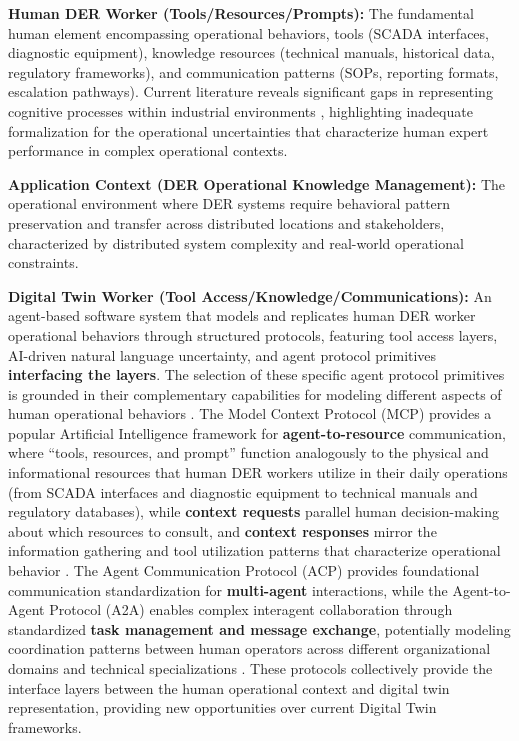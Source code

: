 \documentclass[12pt,a4paper]{article}
\begin{document}
\textbf{Human DER Worker (Tools/Resources/Prompts):} The fundamental human element encompassing operational behaviors, tools (SCADA interfaces, diagnostic equipment), knowledge resources (technical manuals, historical data, regulatory frameworks), and communication patterns (SOPs, reporting formats, escalation pathways). Current literature reveals significant gaps in representing cognitive processes within industrial environments \cite{10.1007/s44163-022-00020-w} \cite{10.1016/j.apergo.2018.07.016}, highlighting inadequate formalization for the operational uncertainties that characterize human expert performance in complex operational contexts.

\textbf{Application Context (DER Operational Knowledge Management):} The operational environment where DER systems require behavioral pattern preservation and transfer across distributed locations and stakeholders, characterized by distributed system complexity and real-world operational constraints.

\textbf{Digital Twin Worker (Tool Access/Knowledge/Communications):} An agent-based software system that models and replicates human DER worker operational behaviors through structured protocols, featuring tool access layers, AI-driven natural language uncertainty, and agent protocol primitives \textbf{interfacing the layers}. The selection of these specific agent protocol primitives is grounded in their complementary capabilities for modeling different aspects of human operational behaviors \cite{2504.16736v2} \cite{2505.02279}. The Model Context Protocol (MCP) provides a popular Artificial Intelligence framework for \textbf{agent-to-resource} communication, where ``tools, resources, and prompt'' function analogously to the physical and informational resources that human DER workers utilize in their daily operations (from SCADA interfaces and diagnostic equipment to technical manuals and regulatory databases), while \textbf{context requests} parallel human decision-making about which resources to consult, and \textbf{context responses} mirror the information gathering and tool utilization patterns that characterize operational behavior \cite{2504.16736v2}. The Agent Communication Protocol (ACP) provides foundational communication standardization for \textbf{multi-agent} interactions, while the Agent-to-Agent Protocol (A2A) enables complex interagent collaboration through standardized \textbf{task management and message exchange}, potentially modeling coordination patterns between human operators across different organizational domains and technical specializations \cite{2505.02279}. These protocols collectively provide the interface layers between the human operational context and digital twin representation, providing new opportunities over current Digital Twin frameworks.
\end{document}
